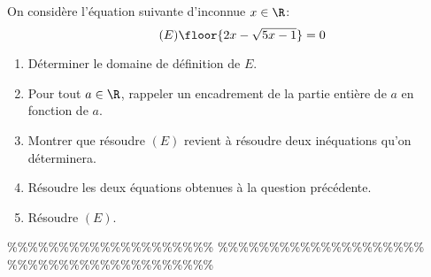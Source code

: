 



\begin{exercice}[Problème]
On considère l'équation suivante d'inconnue $x\in \R$:
\begin{equation}\tag{$E$}
\floor{2x - \sqrt{5x-1}}=0
\end{equation}
\begin{enumerate}
\item Déterminer le domaine de définition de $E$.
\item  Pour tout $a\in \R$, rappeler un encadrement de la partie entière  de $a$ en fonction de $a$. 
\item Montrer que résoudre $(E)$ revient à résoudre deux inéquations qu'on déterminera. 
\item Résoudre les deux équations obtenues à la question précédente. 
\item Résoudre $(E)$. 
\end{enumerate}
\end{exercice}


\%\%\%\%\%\%\%\%\%\%\%\%\%\%\%\%\%\%\%\%
\%\%\%\%\%\%\%\%\%\%\%\%\%\%\%\%\%\%\%\%
\%\%\%\%\%\%\%\%\%\%\%\%\%\%\%\%\%\%\%\%




